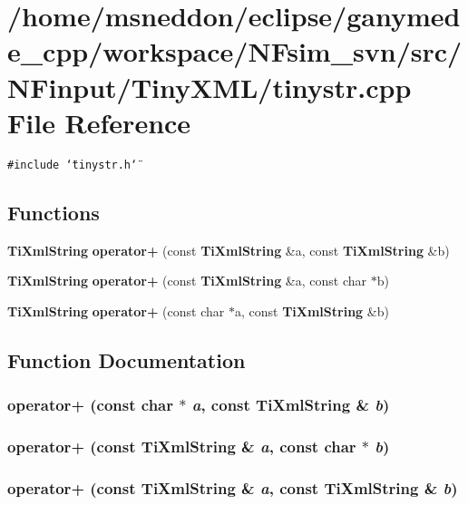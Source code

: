 \section{/home/msneddon/eclipse/ganymede\_\-cpp/workspace/NFsim\_\-svn/src/NFinput/TinyXML/tinystr.cpp File Reference}
\label{tinystr_8cpp}


{\tt \#include \char`\"{}tinystr.h\char`\"{}}\par
\subsection*{Functions}
\begin{CompactItemize}
\item 
{\bf TiXmlString} {\bf operator+} (const {\bf TiXmlString} \&a, const {\bf TiXmlString} \&b)
\item 
{\bf TiXmlString} {\bf operator+} (const {\bf TiXmlString} \&a, const char $\ast$b)
\item 
{\bf TiXmlString} {\bf operator+} (const char $\ast$a, const {\bf TiXmlString} \&b)
\end{CompactItemize}


\subsection{Function Documentation}
\subsubsection{ operator+ (const char $\ast$ {\em a}, const {\bf TiXmlString} \& {\em b})}\label{tinystr_8cpp_c0f2988a051a761664d80de81462fc4d}


\subsubsection{ operator+ (const {\bf TiXmlString} \& {\em a}, const char $\ast$ {\em b})}\label{tinystr_8cpp_b77ef9617d62643b24e52118db159b7b}


\subsubsection{ operator+ (const {\bf TiXmlString} \& {\em a}, const {\bf TiXmlString} \& {\em b})}\label{tinystr_8cpp_6ee35bce93b3aaf8a2353471c0dd2d58}


